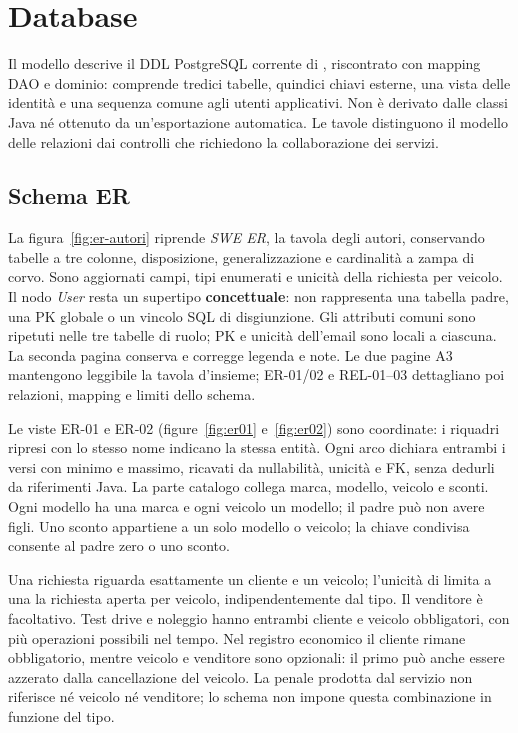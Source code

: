 \section{Database}\label{sec:database}
Il modello descrive il DDL PostgreSQL corrente di ,
riscontrato con mapping DAO e dominio: comprende tredici tabelle,
quindici chiavi esterne, una vista delle identità e una sequenza comune
agli utenti applicativi. Non è derivato dalle classi Java né ottenuto
da un'esportazione automatica. Le tavole distinguono il modello delle
relazioni dai controlli che richiedono la collaborazione dei servizi.

\subsection{Schema ER}
La figura~\ref{fig:er-autori} riprende \emph{SWE ER}, la tavola degli
autori, conservando tabelle a tre colonne, disposizione, generalizzazione
e cardinalit\`a a zampa di corvo. Sono aggiornati campi, tipi enumerati e
unicit\`a della richiesta per veicolo. Il nodo \emph{User} resta un
supertipo \textbf{concettuale}: non rappresenta una tabella padre, una PK
globale o un vincolo SQL di disgiunzione. Gli attributi comuni sono
ripetuti nelle tre tabelle di ruolo; PK e unicit\`a dell'email sono locali
a ciascuna. La seconda pagina conserva e corregge legenda e note.
Le due pagine A3 mantengono leggibile la tavola d'insieme; ER-01/02 e
REL-01--03 dettagliano poi relazioni, mapping e limiti dello schema.

Le viste ER-01 e ER-02 (figure~\ref{fig:er01} e~\ref{fig:er02}) sono
coordinate: i riquadri ripresi con lo stesso nome indicano la stessa
entità. Ogni arco dichiara entrambi i versi con minimo e massimo,
ricavati da nullabilità, unicità e FK, senza dedurli da riferimenti Java.
La parte catalogo collega marca, modello, veicolo e sconti. Ogni modello
ha una marca e ogni veicolo un modello; il padre può non avere figli.
Uno sconto appartiene a un solo modello o veicolo; la chiave condivisa
consente al padre zero o uno sconto.

Una richiesta riguarda esattamente un cliente e un veicolo; l'unicità
di  limita a una la richiesta aperta per veicolo,
indipendentemente dal tipo. Il venditore è facoltativo. Test drive e
noleggio hanno entrambi cliente e veicolo obbligatori, con più operazioni
possibili nel tempo. Nel registro economico il cliente rimane obbligatorio,
mentre veicolo e venditore sono opzionali: il primo può anche essere
azzerato dalla cancellazione del veicolo. La penale prodotta dal servizio
non riferisce né veicolo né venditore; lo schema non impone questa
combinazione in funzione del tipo.

